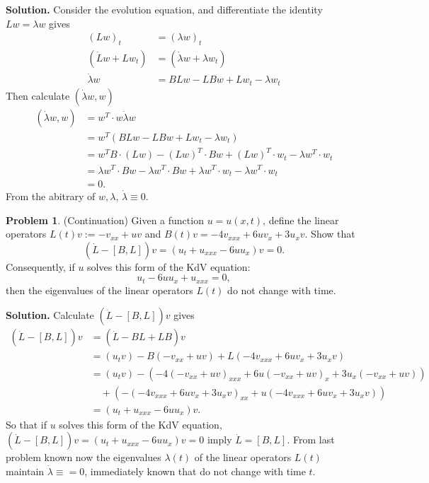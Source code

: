 \documentclass[a4paper]{book}
\newenvironment{solution}%
{\noindent\textbf{Solution.}}%
{\qedhere}
\numberwithin{equation}{chapter}
\theoremstyle{definition}
\newtheorem{pro}[exm]{Problem}
\begin{document}
\begin{solution}
  Consider the evolution equation, and differentiate the identity $Lw = \lambda w$ gives
  \begin{align*}
    (L w)_t & = (\lambda w)_t \\
    (\dot{L} w + L w_t) &= (\dot{\lambda} w + \lambda w_t) \\
    \dot{\lambda} w &= BLw - LBw + L w_t - \lambda w_t 
  \end{align*}
  Then calculate $(\dot{\lambda}w, w)$
  \begin{align*}
    (\dot{\lambda}w, w) & = w^T \cdot w \dot{\lambda} w \\
                        &= w^T (BLw - LBw + L w_t - \lambda w_t) \\
                        &= w^T B \cdot (Lw) - (Lw)^T\cdot Bw + (Lw)^T \cdot w_t - \lambda w^T \cdot w_t \\
                        & = \lambda w^T \cdot Bw - \lambda w^T \cdot Bw + \lambda w^T \cdot w_t - \lambda w^T \cdot w_t \\
    &= 0.
  \end{align*}
  From the abitrary of $w,\lambda$, $\dot{\lambda} \equiv 0$.
\end{solution}


\begin{pro}
  (Continuation) Given a function $u = u(x,t)$, define the linear operators $L(t)v := -v_{xx} + uv$ and $B(t)v = -4v_{xxx} + 6uv_x + 3u_x v$. Show that
  \[(\dot{L} - [B,L])v = (u_t + u_{xxx} - 6uu_x)v = 0.\]
  Consequently, if $u$ solves this form of the KdV equation:
  \[u_t - 6uu_x + u_{xxx} = 0,\]
  then the eigenvalues of the linear operators $L(t)$ do not change with time.
\end{pro}

\begin{solution}
  Calculate $(\dot{L} - [B,L])v$ gives
  \begin{align*}
    (\dot{L} - [B,L])v &= (\dot{L} - BL + LB)v \\
                       &= (u_t v) - B(-v_{xx} + uv) + L(-4 v_{xxx} + 6uv_x + 3u_x v) \\
                       &= (u_t v) - (-4 (-v_{xx} + uv)_{xxx} + 6u (-v_{xx} + uv)_x + 3u_x(-v_{xx} + uv))\\ &\quad+ (-(-4 v_{xxx} + 6uv_x + 3u_x v)_{xx} + u(-4 v_{xxx} + 6uv_x + 3u_x v)) \\
    &=(u_t + u_{xxx} - 6u u_x)v.
  \end{align*}
  So that if $u$ solves this form of the KdV equation, $(\dot{L} - [B,L])v = (u_t + u_{xxx} - 6uu_x)v = 0$ imply $\dot{L} = [B,L]$. From last problem known now the eigenvalues $\lambda(t)$ of the linear operators $L(t)$ maintain $\dot{\lambda} \equiv = 0$, immediately known that do not change with time $t$.
\end{solution}
\end{document}
